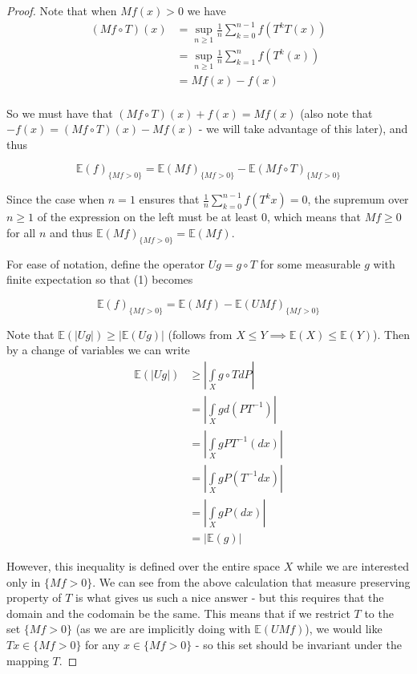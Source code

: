 \documentclass[letterpaper,10pt,oneside,onecolumn,reqno]{amsart}
\newcommand{\E}{\mathbb E}
\theoremstyle{definition}
\begin{document}
\begin{proof}
Note that when $Mf(x) > 0$ we have
\begin{align*}
(Mf \circ T)(x) &= \sup_{n \geq 1} \frac{1}{n}\sum\limits_{k=0}^{n-1} f(T^k T(x)) \\
&= \sup_{n \geq 1} \frac{1}{n}\sum\limits_{k=1}^{n} f(T^k(x)) \\
&= Mf(x) - f(x) \\
\end{align*}

So we must have that $(Mf \circ T)(x) + f(x) = Mf(x)$ (also note that
 $-f(x) = (Mf \circ T)(x) - Mf(x)$ - we will take advantage of this later), and thus 

\begin{equation}
\E(f)_{\{Mf>0\}} = \E(Mf)_{\{Mf>0\}} - \E(Mf \circ T)_{\{Mf>0\}} 
\end{equation}


Since the case when $n=1$ ensures that $\frac{1}{n}\sum\limits_{k=0}^{n-1}f(T^k x) = 0$, the supremum  over $n \geq 1$ of the expression on the left  must be at least $0$, which means that $Mf \geq 0$ for all $n$ and thus $\E(Mf)_{\{Mf>0\}} = \E(Mf)$. 

For ease of notation, define the operator $Ug = g \circ T$ for some measurable $g$ with finite expectation so that (1) becomes

\begin{equation}
\E(f)_{\{Mf>0\}} = \E(Mf) - \E(UMf)_{\{Mf>0\}} 
\end{equation}

Note that $\E(|Ug|) \geq |\E(Ug)|$ (follows from $X \leq Y \implies \E(X) \leq \E(Y)$). Then by a change of variables we can write
\begin{align*}
\E(|Ug|) &\geq |\int\limits_{X} g \circ T dP| \\
&= |\int\limits_{X} g d(PT^{-1})| \\
&= |\int\limits_{X} g PT^{-1}(dx)| \\
&= |\int\limits_{X} g P(T^{-1}dx)| \\
&= |\int\limits_{X} g P(dx)| \\
&= |\E(g)|
\end{align*}

However, this inequality is defined over the entire space $X$ while we are interested only in $\{Mf > 0\}$. We can see from the above calculation that measure preserving property of $T$ is what gives us such a nice answer - but this requires that the domain and the codomain be the same. This means that if we restrict $T$ to the set $\{Mf > 0\}$ (as we are are implicitly doing with $\E(UMf)$), we would like $Tx \in \{Mf > 0\}$ for any $x \in \{Mf > 0\}$ - so this set should be invariant under the mapping $T$. 


\end{proof}
\end{document}
